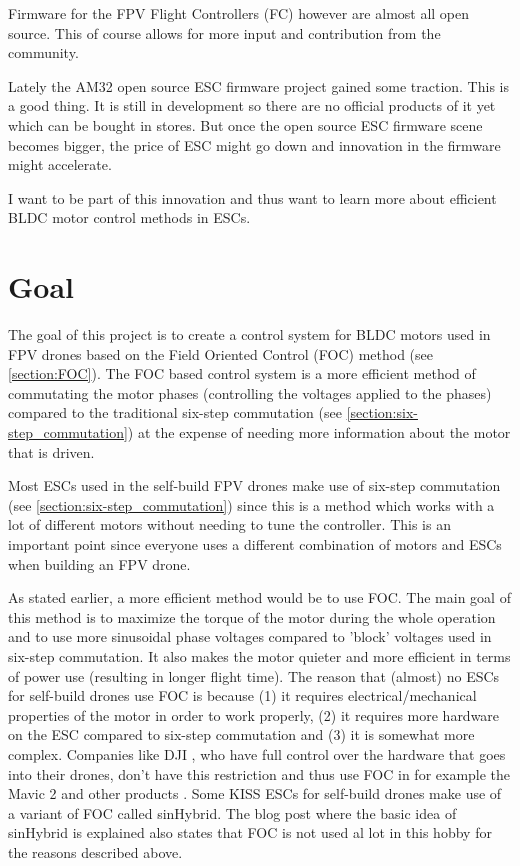 \documentclass[]{report}
\begin{document}
Firmware for the FPV Flight Controllers (FC) however are almost all open source. This of course allows for more input and contribution from the community.

Lately the AM32 \cite{AM32_Git}\cite{AM32_RCGroups} open source ESC firmware project gained some traction. This is a good thing. It is still in development so there are no official products of it yet which can be bought in stores. But once the open source ESC firmware scene becomes bigger, the price of ESC might go down and innovation in the firmware might accelerate.

I want to be part of this innovation and thus want to learn more about efficient BLDC motor control methods in ESCs.

\newpage

\chapter{Goal}
The goal of this project is to create a control system for BLDC motors used in FPV drones based on the Field Oriented Control (FOC) method (see \ref{section:FOC}). The FOC based control system is a more efficient method of commutating the motor phases (controlling the voltages applied to the phases) compared to the traditional six-step commutation (see \ref{section:six-step_commutation}) at the expense of needing more information about the motor that is driven.

Most ESCs used in the self-build FPV drones make use of six-step commutation (see \ref{section:six-step_commutation}) since this is a method which works with a lot of different motors without needing to tune the controller. This is an important point since everyone uses a different combination of motors and ESCs when building an FPV drone.

As stated earlier, a more efficient method would be to use FOC. The main goal of this method is to maximize the torque of the motor during the whole operation and to use more sinusoidal phase voltages compared to 'block' voltages used in six-step commutation. It also makes the motor quieter and more efficient in terms of power use (resulting in longer flight time). The reason that (almost) no ESCs for self-build drones use FOC is because (1) it requires electrical/mechanical properties of the motor in order to work properly, (2) it requires more hardware on the ESC compared to six-step commutation and (3) it is somewhat more complex. Companies like DJI \cite{DJI_website}, who have full control over the hardware that goes into their drones, don't have this restriction and thus use FOC in for example the Mavic 2 \cite{DJI_mavic_2} and other products \cite{DJI_E5000}. Some KISS ESCs for self-build drones make use of a variant of FOC called sinHybrid. The blog post \cite{KISS_sinHybrid} where the basic idea of sinHybrid is explained also states that FOC is not used al lot in this hobby for the reasons described above.
\end{document}

